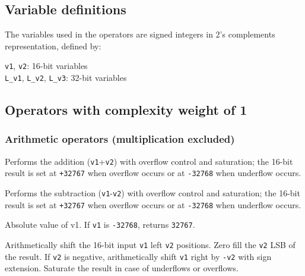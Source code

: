 \subsection{Variable definitions}

The variables used in the operators are signed integers in 2's complements representation, defined by:

{\tt v1}, {\tt v2}: 16-bit variables\\
{\tt L\_v1}, {\tt L\_v2}, {\tt L\_v3}: 32-bit variables


\subsection{Operators with complexity weight of 1}
\subsubsection{Arithmetic operators (multiplication excluded)}


Performs the addition ({\tt v1}+{\tt v2}) with overflow control and saturation; the 16-bit result is set at {\tt +32767} when overflow occurs or at {\tt -32768} when underflow occurs.


Performs the subtraction ({\tt v1}-{\tt v2}) with overflow control and saturation; the 16-bit result is set at {\tt +32767} when overflow occurs or at {\tt -32768} when underflow occurs.


Absolute value of v1.
If {\tt v1} is {\tt -32768}, returns {\tt 32767}.


Arithmetically shift the 16-bit input {\tt v1} left {\tt v2} positions.
Zero fill the {\tt v2} LSB of the result. If {\tt v2} is negative, arithmetically shift {\tt v1} right by {\tt -v2} with sign extension.
Saturate the result in case of underflows or overflows.


